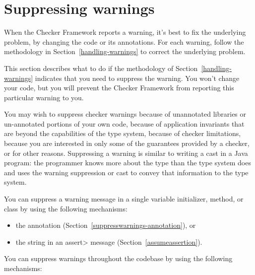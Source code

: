\htmlhr
\chapter{Suppressing warnings\label{suppressing-warnings}}


When the Checker Framework reports a warning, it's best to fix the
underlying problem, by changing the code or its annotations.  For each
warning, follow the methodology in Section~\ref{handling-warnings} to
correct the underlying problem.

This section describes what to do if the methodology of
Section~\ref{handling-warnings} indicates that you need to suppress the
warning.  You won't change your code, but you will prevent the Checker
Framework from reporting this particular warning to you.

You may wish to suppress checker warnings because of unannotated libraries
or un-annotated portions of your own code, because of application
invariants that are beyond the capabilities of the type system, because of
checker limitations, because you are interested in only some of the
guarantees provided by a checker, or for other reasons.
Suppressing a warning is similar to writing a cast in a Java
program:  the programmer knows more about the type than the type system does
and uses the warning suppression or cast to convey that information to the
type system.

You can suppress a warning message in a single variable initializer,
method, or class by using the following mechanisms:

\begin{itemize}
\item
  the  annotation
  (Section~\ref{suppresswarnings-annotation}), or
\item
  the  string in an \<assert> message (Section~\ref{assumeassertion}).
\end{itemize}

You can suppress warnings throughout the codebase by using the following mechanisms:

